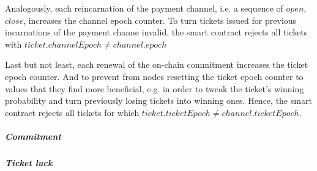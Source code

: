 Analogously, each reincarnation of the payment channel, i.e. a sequence of $open$, $close$, increases the channel epoch counter. To turn tickets issued for previous incarnations of the payment channe invalid, the smart contract rejects all tickets with $ticket.channelEpoch \neq channel.epoch$

Last but not least, each renewal of the on-chain commitment increases the ticket epoch counter. And to prevent from nodes resetting the ticket epoch counter to values that they find more beneficial, e.g. in order to tweak the ticket's winning probability and turn previously losing tickets into winning ones. Hence, the smart contract rejects all tickets for which $ticket.ticketEpoch \neq channel.ticketEpoch$.

\subparagraph{Commitment}



\subparagraph{Ticket luck}






